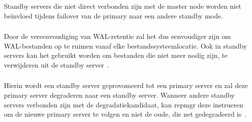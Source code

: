 \subsubsection{}
\label{subsubsec:Cascading Standby Support}

Standby servers die niet direct verbonden zijn met de master node worden niet beïnvloed tijdens failover van de primary naar een andere standby mode.

\subsubsection{}
\label{subsubsec:Vereenvoudigen van het beheer van WAL-retentie en ondersteuning voor replicatiesleuven}

Door de vereenvoudiging van WAL-retentie zal het dus eenvoudiger zijn om WAL-bestanden op te ruimen vanaf elke bestandssysteemlocatie. Ook in standby servers kan het gebruikt worden om bestanden die niet meer nodig zijn, te verwijderen uit de standby server~\autocite{Augustine2019}.

\subsubsection{}
\label{subsubsec:Switchover ondersteuning voor rolswitching tussen primary en standby}

Hierin wordt een standby server geprovomeerd tot een primary server en zal deze primary server degraderen naar een standby server. Wanneer andere standby servers verbonden zijn met de degradatiekandidaat, kan repmgr deze instrueren om de nieuwe primary server te volgen en niet de oude, die net gedegradeerd is~\autocite{2021b}. %

\subsection{}
\label{subsec:PgBouncer}


